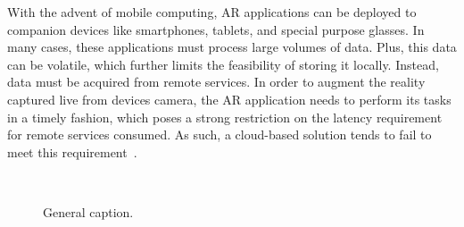 With the advent of mobile computing, AR applications can be deployed to companion devices like smartphones, tablets, and special purpose glasses. In many cases, these applications must process large volumes of data. Plus, this data can be volatile, which further limits the feasibility of storing it locally. Instead, data must be acquired from remote services. In order to augment the reality captured live from devices camera, the AR application needs to perform its tasks in a timely fashion, which poses a strong restriction on the latency requirement for remote services consumed. As such, a cloud-based solution tends to fail to meet this requirement~\cite{ServerlessEdgeESOCC17}. 



\begin{figure}[htbp]
	\centering
	\hfill
	~
	\hfill
	\caption{General caption.} \label{fig:1}
\end{figure}

